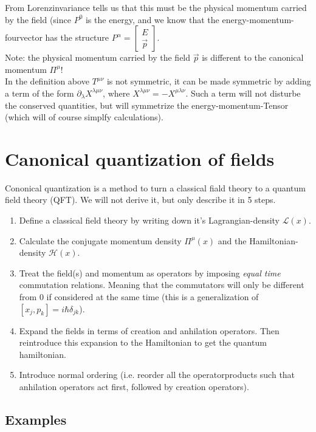\documentclass{report}
\begin{document}
From Lorenzinvariance tells us that this must be the physical momentum carried by the field (since $P^0$ is the energy, and we know that the energy-momentum-fourvector has the structure $P^\alpha = \begin{bmatrix} E \\ \vec{p} \end{bmatrix} $.\\
Note: the physical momentum carried by the field $\vec{p}$ is different to the canonical momentum $\Pi^\mu$!\\
In the definition above $T^{\mu \nu}$ is not symmetric, it can be made symmetric by adding a term of the form $\partial_\lambda X^{\lambda \mu \nu} $, where $X^{\lambda  \mu \nu} = - X^{\mu \lambda \nu}$. Such a term will not disturbe the conserved quantities, but will symmetrize the energy-momentum-Tensor (which will of course simplfy calculations).
\chapter{Canonical quantization of fields}
Cononical quantization is a method to turn a classical fiald theory to a quantum field theory (QFT). We will not derive it, but only describe it in 5 steps.\\
\begin{enumerate}
	\item Define a classical field theory by writing down it's Lagrangian-density $\mathcal{L}(x)$.
	\item Calculate the conjugate momentum density $\Pi^\mu(x)$ and the Hamiltonian-density $\mathcal{H}(x)$.
	\item Treat the field(s) and momentum as operators by imposing \emph{equal time} commutation relations. Meaning that the commutators will only be different from $0$ if considered at the same time (this is a generalization of $[x_j, p_k] = i \hbar \delta_{jk}$).
	\item Expand the fields in terms of creation and anhilation operators. Then reintroduce this expansion to the Hamiltonian to get the quantum hamiltonian.
	\item Introduce normal ordering (i.e. reorder all the operatorproducts such that anhilation operators act first, followed by creation operators).
\end{enumerate}
\section{Examples}
\end{document}
